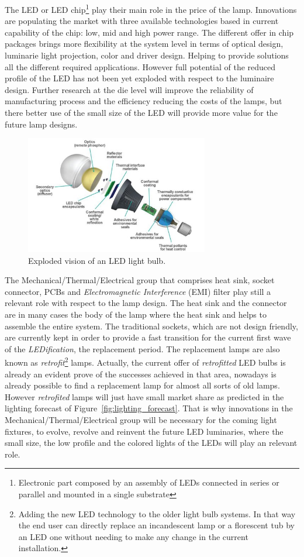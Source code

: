 The LED or LED chip\footnote{Electronic part composed by an assembly of LEDs connected in series or parallel and mounted in a single substrate} play their main role in the price of the lamp. Innovations are populating the market with three available technologies based in current capability of the chip: low, mid and high power range. The different offer in chip packages brings more flexibility at the system level in terms of optical design, luminarie light projection, color and driver design. Helping to provide solutions all the different required applications. However full potential of the reduced profile of the LED has not been yet exploded with respect to the luminaire design. Further research at the die level will improve the reliability of manufacturing process and the efficiency reducing the costs of the lamps, but there better use of the small size of the LED will provide more value for the future lamp designs.

\begin{figure}[!h]
    \centering
    \includegraphics[width=8cm]{./0_intro/img/exploded_bulb_2.jpg}
    \caption{Exploded vision of an LED light bulb.}
    \label{fig:exploded_bulb}
\end{figure}


The Mechanical/Thermal/Electrical group that comprises heat sink, socket connector, PCBs and \emph{Electromagnetic Interference} (EMI) filter play still a relevant role with respect to the lamp design. The heat sink and the connector are in many cases the body of the lamp where the heat sink and helps to assemble the entire system. The traditional sockets, which are not design friendly, are currently kept in order to provide a fast transition for the current first wave of the \emph{LEDification}, the replacement period. The replacement lamps are also known as \emph{retrofit}\footnote{Adding the new LED technology to the older light bulb systems. In that way the end user can directly replace an incandescent lamp or a florescent tub by an LED one without needing to make any change in the current installation.} lamps. Actually, the current offer of \emph{retrofitted} LED bulbs is already an evident prove of the successes achieved in that area, nowadays is already possible to find a replacement lamp for almost all sorts of old lamps. However \emph{retrofited} lamps will just have small market share as predicted in the lighting forecast of Figure~\ref{fig:lighting_forecast}. That is why innovations in the Mechanical/Thermal/Electrical group will be necessary for the coming light fixtures, to evolve, revolve and reinvent the future LED luminaries, where the small size, the low profile and the colored lights of the LEDs will play an relevant role.




